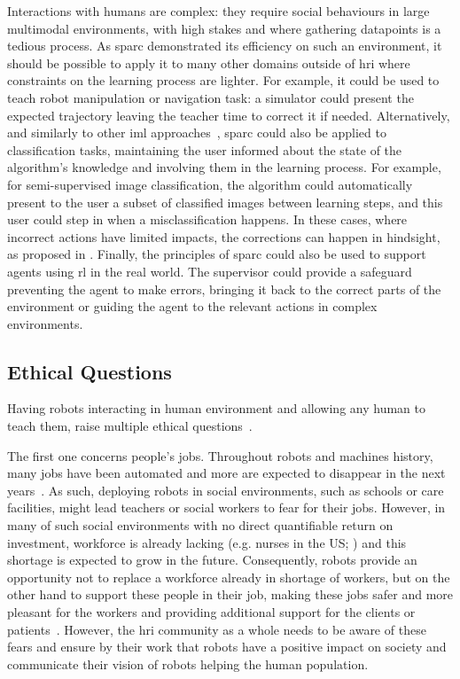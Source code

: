 Interactions with humans are complex: they require social behaviours in large multimodal environments, with high stakes and where gathering datapoints is a tedious process. As \gls{sparc} demonstrated its efficiency on such an environment, it should be possible to apply it to many other domains outside of \gls{hri} where constraints on the learning process are lighter. For example, it could be used to teach robot manipulation or navigation task: a simulator could present the expected trajectory leaving the teacher time to correct it if needed. Alternatively, and similarly to other \gls{iml} approaches~\citep{fails2003interactive}, \gls{sparc} could also be applied to classification tasks, maintaining the user informed about the state of the algorithm's knowledge and involving them in the learning process. For example, for semi-supervised image classification, the algorithm could automatically present to the user a subset of classified images between learning steps, and this user could step in when a misclassification happens. In these cases, where incorrect actions have limited impacts, the corrections can happen in hindsight, as proposed in \cite{chernova2009interactive}. Finally, the principles of \gls{sparc} could also be used to support agents using \gls{rl} in the real world. The supervisor could provide a safeguard preventing the agent to make errors, bringing it back to the correct parts of the environment or guiding the agent to the relevant actions in complex environments.

\subsection{Ethical Questions} \label{sec:disc_ethics}
Having robots interacting in human environment and allowing any human to teach them, raise multiple ethical questions~\citep{lin2014robot}.

The first one concerns people's jobs. Throughout robots and machines history, many jobs have been automated and more are expected to disappear in the next years~\citep{frey2017future}. As such, deploying robots in social environments, such as schools or care facilities, might lead teachers or social workers to fear for their jobs. However, in many of such social environments with no direct quantifiable return on investment, workforce is already lacking (e.g. nurses in the US; \citealt{nevidjon2001nursing}) and this shortage is expected to grow in the future. Consequently, robots provide an opportunity not to replace a workforce already in shortage of workers, but on the other hand to support these people in their job, making these jobs safer and more pleasant for the workers and providing additional support for the clients or patients~\citep{wada2005psychological}. However, the \gls{hri} community as a whole needs to be aware of these fears and ensure by their work that robots have a positive impact on society and communicate their vision of robots helping the human population.

